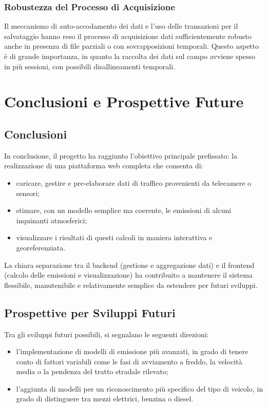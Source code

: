 \documentclass[12pt, oneside]{extbook}
\begin{document}
\subsection{Robustezza del Processo di Acquisizione}

Il meccanismo di auto-accodamento dei dati e l'uso delle transazioni per il salvataggio hanno reso il processo di acquisizione dati sufficientemente robusto anche in presenza di file parziali o con sovrapposizioni temporali. Questo aspetto è di grande importanza, in quanto la raccolta dei dati sul campo avviene spesso in più sessioni, con possibili disallineamenti temporali.

\chapter{Conclusioni e Prospettive Future}

\section{Conclusioni}

In conclusione, il progetto ha raggiunto l'obiettivo principale prefissato: la realizzazione di una piattaforma web completa che consenta di:
\begin{itemize}
 \item caricare, gestire e pre-elaborare dati di traffico provenienti da telecamere o sensori;
 \item stimare, con un modello semplice ma coerente, le emissioni di alcuni inquinanti atmosferici;
 \item visualizzare i risultati di questi calcoli in maniera interattiva e georeferenziata.
\end{itemize}

La chiara separazione tra il backend (gestione e aggregazione dati) e il frontend (calcolo delle emissioni e visualizzazione) ha contribuito a mantenere il sistema flessibile, manutenibile e relativamente semplice da estendere per futuri sviluppi.

\section{Prospettive per Sviluppi Futuri}

Tra gli sviluppi futuri possibili, si segnalano le seguenti direzioni:
\begin{itemize}
 \item l'implementazione di modelli di emissione più avanzati, in grado di tenere conto di fattori variabili come le fasi di avviamento a freddo, la velocità media o la pendenza del tratto stradale rilevato;
 \item l'aggiunta di modelli per un riconoscimento più specifico del tipo di veicolo, in grado di distinguere tra mezzi elettrici, benzina o diesel.
\end{itemize}
\end{document}
